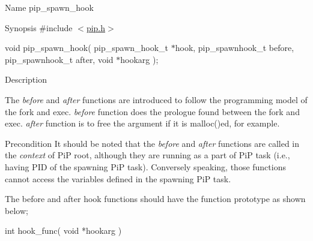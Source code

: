\begin{DoxyParagraph}{Name}
pip\-\_\-spawn\-\_\-hook
\end{DoxyParagraph}
\begin{DoxyParagraph}{Synopsis}
\#include $<$\hyperlink{pip_8h_source}{pip.\-h}$>$ \par
void pip\-\_\-spawn\-\_\-hook( pip\-\_\-spawn\-\_\-hook\-\_\-t $\ast$hook, pip\-\_\-spawnhook\-\_\-t before, pip\-\_\-spawnhook\-\_\-t after, void $\ast$hookarg );
\end{DoxyParagraph}
\begin{DoxyParagraph}{Description}

\end{DoxyParagraph}
The {\itshape before} and {\itshape after} functions are introduced to follow the programming model of the {\ttfamily fork} and {\ttfamily exec}. {\itshape before} function does the prologue found between the {\ttfamily fork} and {\ttfamily exec}. {\itshape after} function is to free the argument if it is {\ttfamily malloc()ed}, for example. \begin{DoxyPrecond}{Precondition}
It should be noted that the {\itshape before} and {\itshape after} functions are called in the {\itshape context} of Pi\-P root, although they are running as a part of Pi\-P task (i.\-e., having P\-I\-D of the spawning Pi\-P task). Conversely speaking, those functions cannot access the variables defined in the spawning Pi\-P task. 

The before and after hook functions should have the function prototype as shown below; 
\begin{DoxyCode}
\textcolor{keywordtype}{int} hook\_func( \textcolor{keywordtype}{void} *hookarg )
\end{DoxyCode}

\end{DoxyPrecond}


